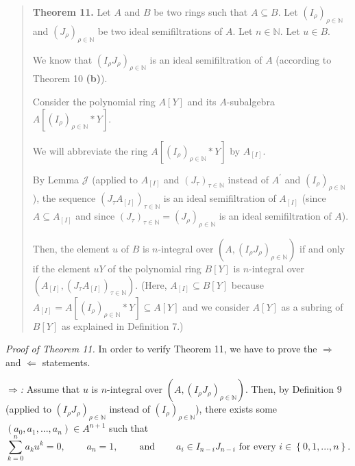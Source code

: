 \documentclass[12pt,final,notitlepage,onecolumn]{article}%
\begin{document}
\begin{quote}
\textbf{Theorem 11.} Let $A$ and $B$ be two rings such that $A\subseteq B$.
Let $\left(  I_{\rho}\right)  _{\rho\in\mathbb{N}}$ and $\left(  J_{\rho
}\right)  _{\rho\in\mathbb{N}}$ be two ideal semifiltrations of $A$. Let
$n\in\mathbb{N}$. Let $u\in B$.

We know that $\left(  I_{\rho}J_{\rho}\right)  _{\rho\in\mathbb{N}}$ is an
ideal semifiltration of $A$ (according to Theorem 10 \textbf{(b)}).

Consider the polynomial ring $A\left[  Y\right]  $ and its $A$-subalgebra
$A\left[  \left(  I_{\rho}\right)  _{\rho\in\mathbb{N}}\ast Y\right]  $.

We will abbreviate the ring $A\left[  \left(  I_{\rho}\right)  _{\rho
\in\mathbb{N}}\ast Y\right]  $ by $A_{\left[  I\right]  }$.

By Lemma $\mathcal{J}$ (applied to $A_{\left[  I\right]  }$ and $\left(
J_{\tau}\right)  _{\tau\in\mathbb{N}}$ instead of $A^{\prime}$ and $\left(
I_{\rho}\right)  _{\rho\in\mathbb{N}}$), the sequence $\left(  J_{\tau
}A_{\left[  I\right]  }\right)  _{\tau\in\mathbb{N}}$ is an ideal
semifiltration of $A_{\left[  I\right]  }$ (since $A\subseteq A_{\left[
I\right]  }$ and since $\left(  J_{\tau}\right)  _{\tau\in\mathbb{N}}=\left(
J_{\rho}\right)  _{\rho\in\mathbb{N}}$ is an ideal semifiltration of $A$).

Then, the element $u$ of $B$ is $n$-integral over $\left(  A,\left(  I_{\rho
}J_{\rho}\right)  _{\rho\in\mathbb{N}}\right)  $ if and only if the element
$uY$ of the polynomial ring $B\left[  Y\right]  $ is $n$-integral over
$\left(  A_{\left[  I\right]  },\left(  J_{\tau}A_{\left[  I\right]  }\right)
_{\tau\in\mathbb{N}}\right)  .$ (Here, $A_{\left[  I\right]  }\subseteq
B\left[  Y\right]  $ because $A_{\left[  I\right]  }=A\left[  \left(  I_{\rho
}\right)  _{\rho\in\mathbb{N}}\ast Y\right]  \subseteq A\left[  Y\right]  $
and we consider $A\left[  Y\right]  $ as a subring of $B\left[  Y\right]  $ as
explained in Definition 7.)
\end{quote}

\textit{Proof of Theorem 11.} In order to verify Theorem 11, we have to prove
the $\Longrightarrow$ and $\Longleftarrow$ statements.

$\Longrightarrow$\textit{:} Assume that $u$ is $n$-integral over $\left(
A,\left(  I_{\rho}J_{\rho}\right)  _{\rho\in\mathbb{N}}\right)  $. Then, by
Definition 9 (applied to $\left(  I_{\rho}J_{\rho}\right)  _{\rho\in
\mathbb{N}}$ instead of $\left(  I_{\rho}\right)  _{\rho\in\mathbb{N}}$),
there exists some $\left(  a_{0},a_{1},...,a_{n}\right)  \in A^{n+1}$ such
that%
\[
\sum\limits_{k=0}^{n}a_{k}u^{k}=0,\ \ \ \ \ \ \ \ \ \ a_{n}%
=1,\ \ \ \ \ \ \ \ \ \ \text{and}\ \ \ \ \ \ \ \ \ \ a_{i}\in I_{n-i}%
J_{n-i}\text{ for every }i\in\left\{  0,1,...,n\right\}  .
\]
\end{document}
